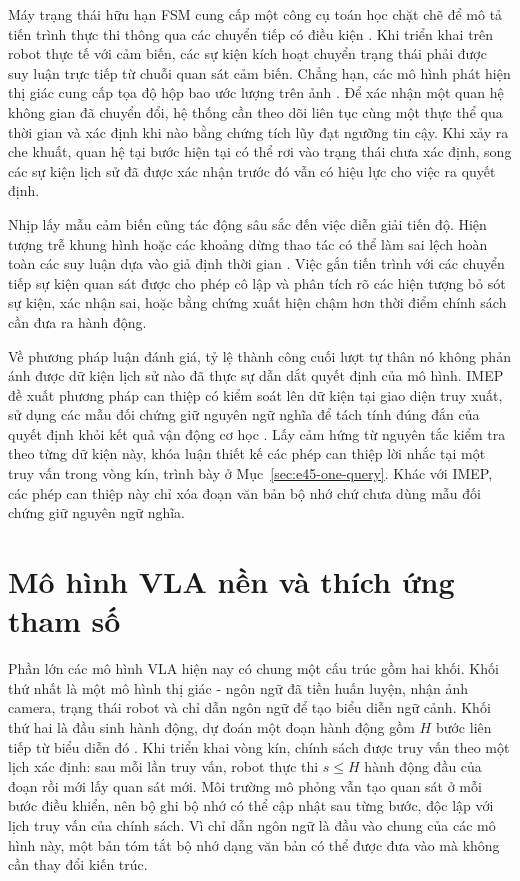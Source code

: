 Máy trạng thái hữu hạn FSM cung cấp một công cụ toán học chặt chẽ để mô tả tiến trình thực thi thông qua các chuyển tiếp có điều kiện \cite{rewardmachines2018}. Khi triển khai trên robot thực tế với cảm biến, các sự kiện kích hoạt chuyển trạng thái phải được suy luận trực tiếp từ chuỗi quan sát cảm biến. Chẳng hạn, các mô hình phát hiện thị giác cung cấp tọa độ hộp bao ước lượng trên ảnh \cite{groundingdino2024}. Để xác nhận một quan hệ không gian đã chuyển đổi, hệ thống cần theo dõi liên tục cùng một thực thể qua thời gian và xác định khi nào bằng chứng tích lũy đạt ngưỡng tin cậy. Khi xảy ra che khuất, quan hệ tại bước hiện tại có thể rơi vào trạng thái chưa xác định, song các sự kiện lịch sử đã được xác nhận trước đó vẫn có hiệu lực cho việc ra quyết định.

Nhịp lấy mẫu cảm biến cũng tác động sâu sắc đến việc diễn giải tiến độ. Hiện tượng trễ khung hình hoặc các khoảng dừng thao tác có thể làm sai lệch hoàn toàn các suy luận dựa vào giả định thời gian \cite{clockvla2026}. Việc gắn tiến trình với các chuyển tiếp sự kiện quan sát được cho phép cô lập và phân tích rõ các hiện tượng bỏ sót sự kiện, xác nhận sai, hoặc bằng chứng xuất hiện chậm hơn thời điểm chính sách cần đưa ra hành động.

Về phương pháp luận đánh giá, tỷ lệ thành công cuối lượt tự thân nó không phản ánh được dữ kiện lịch sử nào đã thực sự dẫn dắt quyết định của mô hình. IMEP đề xuất phương pháp can thiệp có kiểm soát lên dữ kiện tại giao diện truy xuất, sử dụng các mẫu đối chứng giữ nguyên ngữ nghĩa để tách tính đúng đắn của quyết định khỏi kết quả vận động cơ học \cite{imep2026}. Lấy cảm hứng từ nguyên tắc kiểm tra theo từng dữ kiện này, khóa luận thiết kế các phép can thiệp lời nhắc tại một truy vấn trong vòng kín, trình bày ở Mục~\ref{sec:e45-one-query}. Khác với IMEP, các phép can thiệp này chỉ xóa đoạn văn bản bộ nhớ chứ chưa dùng mẫu đối chứng giữ nguyên ngữ nghĩa.

\section{Mô hình VLA nền và thích ứng tham số}
\label{sec:vla-backbones}

Phần lớn các mô hình VLA hiện nay có chung một cấu trúc gồm hai khối. Khối thứ nhất là một mô hình thị giác - ngôn ngữ đã tiền huấn luyện, nhận ảnh camera, trạng thái robot và chỉ dẫn ngôn ngữ để tạo biểu diễn ngữ cảnh. Khối thứ hai là đầu sinh hành động, dự đoán một đoạn hành động gồm $H$ bước liên tiếp từ biểu diễn đó \cite{rt22023,openvla2024,octo2024}. Khi triển khai vòng kín, chính sách được truy vấn theo một lịch xác định: sau mỗi lần truy vấn, robot thực thi $s \le H$ hành động đầu của đoạn rồi mới lấy quan sát mới. Môi trường mô phỏng vẫn tạo quan sát ở mỗi bước điều khiển, nên bộ ghi bộ nhớ có thể cập nhật sau từng bước, độc lập với lịch truy vấn của chính sách. Vì chỉ dẫn ngôn ngữ là đầu vào chung của các mô hình này, một bản tóm tắt bộ nhớ dạng văn bản có thể được đưa vào mà không cần thay đổi kiến trúc.

